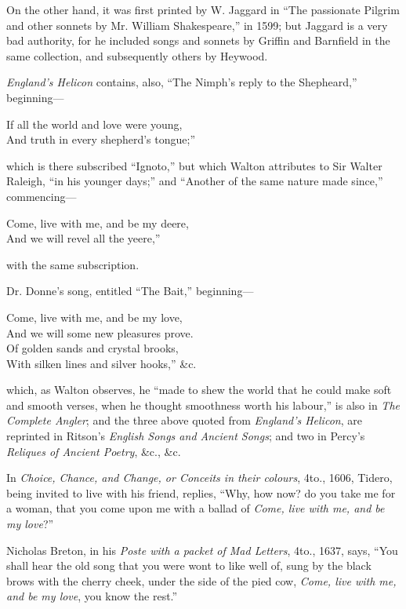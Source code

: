 On the other hand, it was first printed by W. Jaggard in “The passionate
Pilgrim and other sonnets by Mr. William Shakespeare,” in 1599; but Jaggard
is a very bad authority, for he included songs and sonnets by Griffin and Barnfield
in the same collection, and subsequently others by Heywood.

\textit{England’s Helicon} contains, also, “The Nimph’s reply to the Shepheard,”
beginning—
\settowidth{\versewidth}{And we will some new pleasures prove.}
\begin{scverse}
If all the world and love were young,\\
And truth in every shepherd’s tongue;”
\end{scverse}
which is there subscribed “Ignoto,” but which Walton attributes to Sir Walter
Raleigh, “in his younger days;” and “Another of the same nature made since,”
commencing—
\begin{scverse}
Come, live with me, and be my deere,\\
And we will revel all the yeere,”
\end{scverse}
with the same subscription.

Dr. Donne’s song, entitled “The Bait,” beginning—
\begin{scverse}
Come, live with me, and be my love,\\
And we will some new pleasures prove.\\
Of golden sands and crystal brooks,\\
With silken lines and silver hooks,” \&c.
\end{scverse}
which, as Walton observes, he “made to shew the world that he could make soft
and smooth verses, when he thought smoothness worth his labour,” is also in
\textit{The Complete Angler}; and the three above quoted from \textit{England’s Helicon}, are
reprinted in Ritson’s \textit{English Songs and Ancient Songs}; and two in Percy’s
\textit{Reliques of Ancient Poetry}, \&c., \&c.

In \textit{Choice, Chance, and Change, or Conceits in their colours}, 4to., 1606,
Tidero, being invited to live with his friend, replies, “Why, how now? do you
take me for a woman, that you come upon me with a ballad of \textit{Come, live with me,
and be my love}?”

Nicholas Breton, in his \textit{Poste with a packet of Mad Letters}, 4to., 1637, says,
“You shall hear the old song that you were wont to like well of, sung by the
black brows with the cherry cheek, under the side of the pied cow, \textit{Come, live with
me, and be my love}, you know the rest.”

